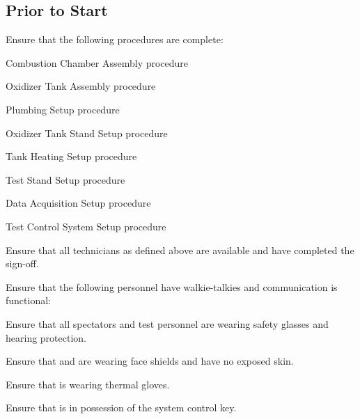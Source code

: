 \newpage
\subsection{Prior to Start}
\begin{checklist}
    \item Ensure that the following procedures are complete:
    \begin{checklist}
        \item Combustion Chamber Assembly procedure
        \item Oxidizer Tank Assembly procedure
        \item Plumbing Setup procedure
        \item Oxidizer Tank Stand Setup procedure
        \item Tank Heating Setup procedure
        \item Test Stand Setup procedure
        \item Data Acquisition Setup procedure
        \item Test Control System Setup procedure
    \end{checklist}
    \item Ensure that all technicians as defined above are available and have completed the sign-off.
    \item Ensure that the following personnel have walkie-talkies and communication is functional:
    \begin{checklist}
        \item \ops{}
        \item \secondary
        \item \daq{}
        \item \heat
        \item \peri{}
        \item \perii{}
    \end{checklist}
    \item Ensure that all spectators and test personnel are wearing safety glasses and hearing protection.
    \item Ensure that \primary{} and \secondary{} are wearing face shields and have no exposed skin.
    \item Ensure that \primary{} is wearing thermal gloves.
    \item Ensure that \secondary{} is in possession of the system control key.
\end{checklist}
\setcounter{checklistnum}{0}


